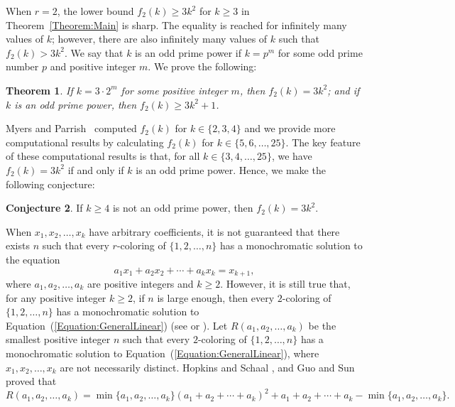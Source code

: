 \documentclass[11pt]{article}
\newtheorem{theorem}{Theorem}[section]
\theoremstyle{definition}
\newtheorem{conjecture}[theorem]{Conjecture}
\begin{document}
When $r=2$, the lower bound $f_2(k)\geq3k^2$ for $k\geq3$ in Theorem~\ref{Theorem:Main} is sharp. The equality is reached for infinitely many values of $k$; however, there are also infinitely many values of $k$ such that $f_2(k)>3k^2$. We say that $k$ is an odd prime power if $k=p^m$ for some odd prime number $p$ and positive integer $m$. We prove the following:
\begin{theorem}\label{Theorem:2-ColoringsCombined}
If $k=3\cdot2^m$ for some positive integer $m$, then $f_2(k)=3k^2$; and if $k$ is an odd prime power, then $f_2(k)\geq3k^2+1$.
\end{theorem}

Myers and Parrish~\cite{MyersParrish2018} computed $f_2(k)$ for $k\in\{2,3,4\}$ and we provide more computational results by calculating $f_2(k)$ for $k\in\{5,6,\ldots,25\}$. The key feature of these computational results is that, for all $k\in\{3,4,\ldots,25\}$, we have $f_2(k)=3k^2$ if and only if $k$ is an odd prime power. Hence, we make the following conjecture:
\begin{conjecture}
    If $k\geq4$ is not an odd prime power, then $f_2(k)=3k^2$.
\end{conjecture}

When $x_1,x_2,\ldots,x_k$ have arbitrary coefficients, it is not guaranteed that there exists $n$ such that every $r$-coloring of $\{1,2,\ldots,n\}$ has a monochromatic solution to the equation
\begin{equation}\label{Equation:GeneralLinear}
    a_1x_1+a_2x_2+\cdots+a_kx_k=x_{k+1},
\end{equation}
where $a_1,a_2,\ldots,a_k$ are positive integers and $k\geq2$. However, it is still true that, for any positive integer $k\geq2$, if $n$ is large enough, then every $2$-coloring of $\{1,2,\ldots,n\}$ has a monochromatic solution to Equation~(\ref{Equation:GeneralLinear}) (see \cite[Theorem~9.2]{LandmanRobertson2014} or \cite[Theorem~0.1]{MR2007}). Let $R(a_1,a_2,\ldots,a_k)$ be the smallest positive integer $n$ such that every $2$-coloring of $\{1,2,\ldots,n\}$ has a monochromatic solution to Equation~(\ref{Equation:GeneralLinear}), where $x_1,x_2,\ldots,x_k$ are not necessarily distinct. Hopkins and Schaal \cite{HS2005}, and Guo and Sun~\cite{GS2008} proved that \[R(a_1,a_2,\ldots,a_k)=\min\{a_1,a_2,\ldots,a_k\}(a_1+a_2+\cdots+a_k)^2+a_1+a_2+\cdots+a_k-\min\{a_1,a_2,\ldots,a_k\}.\]
\end{document}
